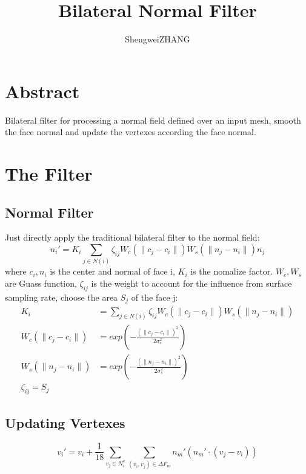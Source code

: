 \documentclass{article}
\title{Bilateral Normal Filter}
\author{ShengweiZHANG\\
}
\theoremstyle{definition}
\theoremstyle{remark}
\begin{document}
\maketitle

\section{Abstract}
Bilateral filter for processing a normal field defined over an input mesh, smooth the face normal and update the vertexes according the face normal.
\section{The Filter}
\subsection{Normal Filter}
Just directly apply the traditional bilateral filter to the normal field:
\begin{equation}
  n_i' = K_i \sum_{j\in N(i)} \zeta_{ij} W_c(\parallel c_j-c_i\parallel) W_s(\parallel n_j - n_i \parallel) n_j
\end{equation}
where $c_i, n_i$  is the center and normal of face i, $K_i$ is the nomalize factor. $W_c, W_s$ are Guass function, $\zeta_{ij}$ is the weight to account for the influence from surface sampling rate, choose the area $S_j$ of the face j:
\begin{equation}
  \begin{aligned}
    K_i &= \sum_{j\in N(i)} \zeta_{ij} W_c(\parallel c_j-c_i\parallel) W_s(\parallel n_j - n_i \parallel) \\
    W_c(\parallel c_j-c_i \parallel) &= exp(-\frac{(\parallel c_j-c_i \parallel)^2}{2\sigma_c^2})\\
    W_s(\parallel n_j-n_i \parallel) &= exp(-\frac{(\parallel n_j-n_i \parallel)^2} {2\sigma_s^2})\\
    \zeta_{ij} = S_j
  \end{aligned}
\end{equation}
\subsection{Updating Vertexes}
\begin{equation}
  v_i' = v_i + \frac{1}{18} \sum_{v_j \in N_i^v} \sum_{ (v_i, v_j) \in \Delta F_m} n_m'(n_m' \cdot (v_j - v_i))
\end{equation}
\end{document}
